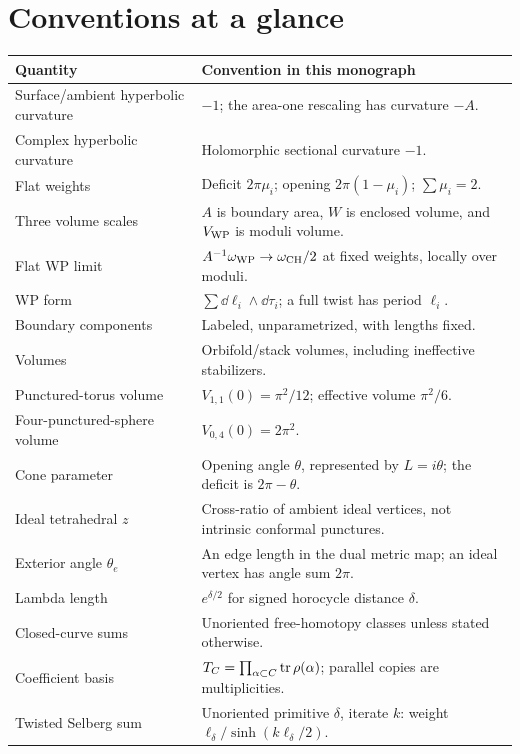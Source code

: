 \section{Conventions at a glance}
\label{app:conventions}

\begingroup\small
\begin{longtable}{@{}>{\raggedright\arraybackslash}p{}
 >{\raggedright\arraybackslash}p{}@{}}
\toprule
Quantity & Convention in this monograph\\
\midrule
\endhead
Surface/ambient hyperbolic curvature & $-1$; the area-one rescaling has curvature $-A$.\\
Complex hyperbolic curvature & Holomorphic sectional curvature $-1$.\\
Flat weights & Deficit $2\pi\mu_i$; opening $2\pi(1-\mu_i)$; $\sum\mu_i=2$.\\
Three volume scales & $A$ is boundary area, $W$ is enclosed volume, and $V_{\mathrm{WP}}$ is moduli volume.\\
Flat WP limit & $A^{-1}\omega_{\mathrm{WP}}\to\omega_{\mathrm{CH}}/2$ at fixed weights, locally over moduli.\\
WP form & $\sum\dd\ell_i\wedge\dd\tau_i$; a full twist has period $\ell_i$.\\
Boundary components & Labeled, unparametrized, with lengths fixed.\\
Volumes & Orbifold/stack volumes, including ineffective stabilizers.\\
Punctured-torus volume & $V_{1,1}(0)=\pi^2/12$; effective volume $\pi^2/6$.\\
Four-punctured-sphere volume & $V_{0,4}(0)=2\pi^2$.\\
Cone parameter & Opening angle $\theta$, represented by $L=i\theta$; the deficit is $2\pi-\theta$.\\
Ideal tetrahedral $z$ & Cross-ratio of ambient ideal vertices, not intrinsic conformal punctures.\\
Exterior angle $\theta_e$ & An edge length in the dual metric map; an ideal vertex has angle sum $2\pi$.\\
Lambda length & $e^{\delta/2}$ for signed horocycle distance $\delta$.\\
Closed-curve sums & Unoriented free-homotopy classes unless stated otherwise.\\
Coefficient basis & $T_C=\prod_{\alpha\subset C}\operatorname{tr}\rho(\alpha)$; parallel copies are multiplicities.\\
Twisted Selberg sum & Unoriented primitive $\delta$, iterate $k$: weight $\ell_\delta/\sinh(k\ell_\delta/2)$.\\

\end{longtable}
